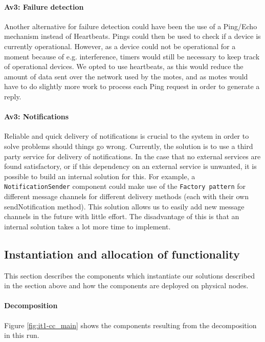         \paragraph{Av3: Failure detection}
            Another alternative for failure detection could have been the use of
            a Ping/Echo mechanism instead of Heartbeats. Pings could then be used
            to check if a device is currently operational. However, as a device could
            not be operational for a moment because of e.g. interference, timers
            would still be necessary to keep track of operational devices. We opted
            to use heartbeats, as this would reduce the amount of data sent over
            the network used by the motes, and as motes would have to do slightly
            more work to process each Ping request in order to generate a reply.

        \paragraph{Av3: Notifications}
            Reliable and quick delivery of notifications is crucial to the
            system in order to solve problems should things go wrong. Currently,
            the solution is to use a third party service for delivery of
            notifications. In the case that no external services are found
            satisfactory, or if this dependency on an external service is
            unwanted, it is possible to build an internal solution for this.
            For example, a \texttt{NotificationSender} component could make use
            of the \texttt{Factory pattern} for different message channels for
            different delivery methods (each with their own sendNotification method).
            This solution allows us to easily add new message channels in the
            future with little effort. The disadvantage of this is that an
            internal solution takes a lot more time to implement.


\subsection{Instantiation and allocation of functionality}
    This section describes the components which instantiate our solutions described
    in the section above and how the components are deployed on physical nodes.

    \paragraph{Decomposition}
        Figure \ref{fig:it1-cc_main} shows the components resulting from the
        decomposition in this run.

